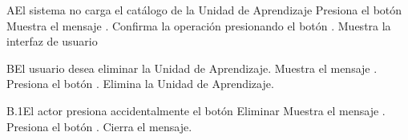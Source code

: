 
\begin{comment}
\begin{UCtrayectoriaA}{A}{El sistema no encuentra ningún formulario para mostrar.}
	\UCpaso No encuentra ningún formulario para mostrar.
    \UCpaso El sistema muestra el mensaje \MSGref{MSG6}{Por el momento no se puede registrar la bibliografía}.
    \UCpaso[\UCactor] Cierra el mensaje presionando el botón \IUbutton{Aceptar}.
    \UCpaso Continua en el paso 1 de la trayectoria principal del \UCref{CU1}.
\end{UCtrayectoriaA}
\end{comment}


\begin{UCtrayectoriaA}{A}{El sistema no carga el catálogo de la Unidad de Aprendizaje}
	\UCpaso[\UCactor] Presiona el botón 
	\UCpaso Muestra el mensaje .
	\UCpaso[\UCactor] Confirma la operación presionando el botón .
	 \UCpaso Muestra la interfaz de usuario 

\end{UCtrayectoriaA}





\begin{UCtrayectoriaA}{B}{El usuario desea eliminar la Unidad de Aprendizaje.}
	\UCpaso  Muestra el mensaje .
	\UCpaso[\UCactor] Presiona el botón .
	\UCpaso Elimina la Unidad de Aprendizaje.
\end{UCtrayectoriaA}



\begin{UCtrayectoriaA}{B.1}{El actor presiona accidentalmente el botón Eliminar}
	\UCpaso Muestra el mensaje .
	\UCpaso[\UCactor] Presiona el botón .
	\UCpaso Cierra el mensaje.

\end{UCtrayectoriaA}

